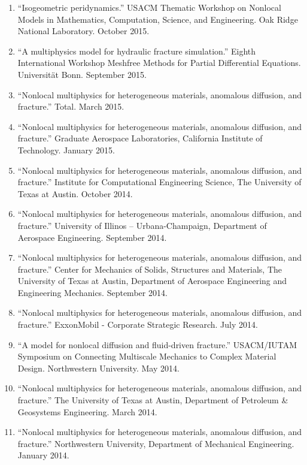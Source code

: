 \begin{etaremune}
\else
\begin{enumerate}
\fi
    \item ``Isogeometric peridynamics.'' USACM Thematic Workshop on Nonlocal Models in Mathematics, Computation, Science, and Engineering.  Oak Ridge National Laboratory. October 2015.
    \item ``A multiphysics model for hydraulic fracture simulation.''  Eighth International Workshop Meshfree Methods for Partial Differential Equations. Universit\"{a}t Bonn. September 2015.
    \item ``Nonlocal multiphysics for heterogeneous materials, anomalous diffusion, and fracture.'' Total. March 2015.
    \item ``Nonlocal multiphysics for heterogeneous materials, anomalous diffusion, and fracture.'' Graduate Aerospace Laboratories, California Institute of Technology. January 2015.
    \item ``Nonlocal multiphysics for heterogeneous materials, anomalous diffusion, and fracture.'' Institute for Computational Engineering Science, The University of Texas at Austin. October 2014.
    \item ``Nonlocal multiphysics for heterogeneous materials, anomalous diffusion, and fracture.'' University of Illinos -- Urbana-Champaign, Department of Aerospace Engineering. September 2014.
    \item ``Nonlocal multiphysics for heterogeneous materials, anomalous diffusion, and fracture.'' Center for Mechanics of Solids, Structures and Materials, The University of Texas at Austin, Department of Aerospace Engineering and Engineering Mechanics. September 2014.
    \item ``Nonlocal multiphysics for heterogeneous materials, anomalous diffusion, and fracture.'' ExxonMobil - Corporate Strategic Research. July 2014.
    \item ``A model for nonlocal diffusion and fluid-driven fracture.'' USACM/IUTAM Symposium on Connecting Multiscale Mechanics to Complex Material Design. Northwestern University. May 2014.
    \item ``Nonlocal multiphysics for heterogeneous materials, anomalous diffusion, and fracture.'' The University of Texas at Austin, Department of Petroleum \& Geosystems Engineering. March 2014.
    \item ``Nonlocal multiphysics for heterogeneous materials, anomalous diffusion, and fracture.'' Northwestern University, Department of Mechanical Engineering. January 2014.

\end{enumerate}
\end{etaremune}
